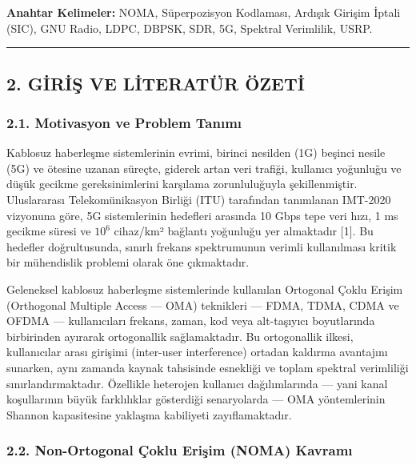\documentclass[
]{IEEEtran}
\begin{document}
\textbf{Anahtar Kelimeler:} NOMA, Süperpozisyon Kodlaması, Ardışık
Girişim İptali (SIC), GNU Radio, LDPC, DBPSK, SDR, 5G, Spektral
Verimlilik, USRP.

\begin{center}\rule{0.5\linewidth}{0.5pt}\end{center}

\subsection{2. GİRİŞ VE LİTERATÜR
ÖZETİ}\label{giriux15f-ve-literatuxfcr-uxf6zeti}

\subsubsection{2.1. Motivasyon ve Problem
Tanımı}\label{motivasyon-ve-problem-tanux131mux131}

Kablosuz haberleşme sistemlerinin evrimi, birinci nesilden (1G) beşinci
nesile (5G) ve ötesine uzanan süreçte, giderek artan veri trafiği,
kullanıcı yoğunluğu ve düşük gecikme gereksinimlerini karşılama
zorunluluğuyla şekillenmiştir. Uluslararası Telekomünikasyon Birliği
(ITU) tarafından tanımlanan IMT-2020 vizyonuna göre, 5G sistemlerinin
hedefleri arasında 10 Gbps tepe veri hızı, 1 ms gecikme süresi ve
\(10^6\) cihaz/km² bağlantı yoğunluğu yer almaktadır {[}1{]}. Bu
hedefler doğrultusunda, sınırlı frekans spektrumunun verimli
kullanılması kritik bir mühendislik problemi olarak öne çıkmaktadır.

Geleneksel kablosuz haberleşme sistemlerinde kullanılan Ortogonal Çoklu
Erişim (Orthogonal Multiple Access --- OMA) teknikleri --- FDMA, TDMA,
CDMA ve OFDMA --- kullanıcıları frekans, zaman, kod veya alt-taşıyıcı
boyutlarında birbirinden ayırarak ortogonallik sağlamaktadır. Bu
ortogonallik ilkesi, kullanıcılar arası girişimi (inter-user
interference) ortadan kaldırma avantajını sunarken, aynı zamanda kaynak
tahsisinde esnekliği ve toplam spektral verimliliği sınırlandırmaktadır.
Özellikle heterojen kullanıcı dağılımlarında --- yani kanal koşullarının
büyük farklılıklar gösterdiği senaryolarda --- OMA yöntemlerinin Shannon
kapasitesine yaklaşma kabiliyeti zayıflamaktadır.

\subsubsection{2.2. Non-Ortogonal Çoklu Erişim (NOMA)
Kavramı}\label{non-ortogonal-uxe7oklu-eriux15fim-noma-kavramux131}
\end{document}
